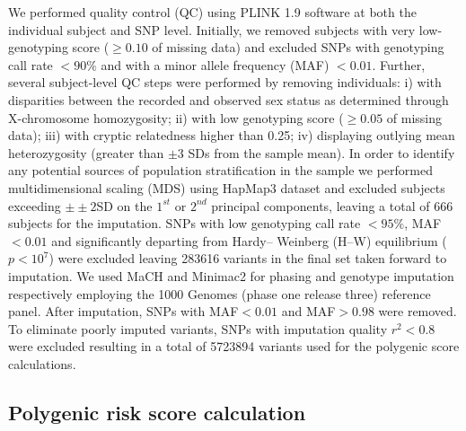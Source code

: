 We performed quality control (QC) using PLINK 1.9 software at both the individual subject and SNP level. Initially, we removed subjects with very low-genotyping score ($\geq 0.10$ of missing data) and excluded SNPs with genotyping call rate $<90\%$ and with a minor allele frequency (MAF) $< 0.01$. Further, several subject-level QC steps were performed by removing individuals: i) with disparities between the recorded and observed sex status as determined through X-chromosome homozygosity; ii) with low genotyping score ($\geq 0.05$ of missing data); iii) with cryptic relatedness higher than 0.25; iv) displaying outlying mean heterozygosity (greater than $\pm3$ SDs from the sample mean). In order to identify any potential sources of population stratification in the sample we performed multidimensional scaling (MDS) using HapMap3 dataset \citep{Consortium2010} and excluded subjects exceeding $\pm±2$SD on the $1^{st}$ or $2^{nd}$ principal components, leaving a total of 666 subjects for the imputation. SNPs with low genotyping call rate $<95\%$, MAF$<0.01$ and significantly departing from Hardy– Weinberg (H–W) equilibrium ($p<10^{7}$) were excluded leaving \num{283 616} variants in the final set taken forward to imputation. We used MaCH and Minimac2 for phasing and genotype imputation respectively employing the 1000 Genomes (phase one release three) reference panel. After imputation, SNPs with MAF$<0.01$ and MAF$>0.98$ were removed. To eliminate poorly imputed variants, SNPs with imputation quality $r^{2} < 0.8$ were excluded resulting in a total of \num{5723894} variants used for the polygenic score calculations.

\subsection{Polygenic risk score calculation}

